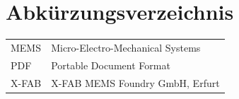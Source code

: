 \section*{Abkürzungsverzeichnis}

\begin{tabular}{p{3cm} p{10cm}}
	MEMS  & Micro-Electro-Mechanical Systems \\
	PDF   & Portable Document Format \\
	X-FAB & X-FAB MEMS Foundry GmbH, Erfurt \\
\end{tabular}

